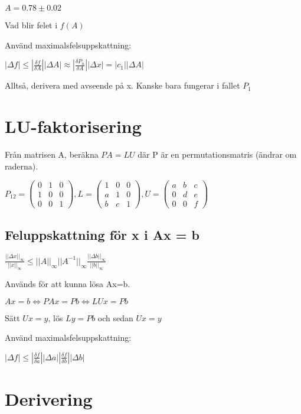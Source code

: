 \documentclass[12pt,a4paper]{article}
\begin{document}
$A = 0.78 \pm 0.02$

Vad blir felet i $f(A)$

Använd maximalsfelsuppskattning:

$|\Delta f| \leq |\frac{\delta f}{\delta A}| |\Delta A| \approx |\frac{\delta P_n}{\delta A}| |\Delta x| = |c_1||\Delta A|$ 

Alltså, derivera med avseende på x. Kanske bara fungerar i fallet $P_1$

\section{LU-faktorisering}
Från matrisen A, beräkna $PA=LU$ där P är en permutationsmatris (ändrar om raderna).

$P_{12} = 
\begin{pmatrix}
0 & 1 & 0 \\
1 & 0 & 0 \\
0 & 0 & 1
\end{pmatrix}
,
L = 
\begin{pmatrix}
1 & 0 & 0 \\
a & 1 & 0 \\
b & c & 1
\end{pmatrix}
,
U = 
\begin{pmatrix}
a & b & c \\
0 & d & e \\
0 & 0 & f
\end{pmatrix}
$


\subsection{Feluppskattning för x i Ax = b}
$\frac{||\Delta x||_\infty}{||x||_\infty} \leq ||A||_\infty ||A^{-1}||_\infty \frac{||\Delta b||_\infty}{||b||_\infty}$


Används för att kunna lösa Ax=b.

$Ax = b \Leftrightarrow PAx = Pb \Leftrightarrow LUx = Pb$

Sätt $Ux = y$, lös $Ly = Pb$ och sedan $Ux = y$

Använd maximalsfelsuppskattning:

$|\Delta f| \leq |\frac{\delta f}{\delta a}| |\Delta a| 
|\frac{\delta f}{\delta b}| |\Delta b|$ 

\section{Derivering}
\end{document}
